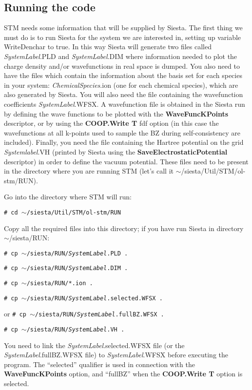 \subsection{Running the code}

 {\sc STM} needs some information that will be supplied by {\sc Siesta}. 
 The first thing we must do is to run {\sc Siesta} for 
 the system we are interested in,
 setting up variable WriteDenchar to true. 
 In this way {\sc Siesta} will generate
 two files called {\it SystemLabel}.PLD and {\it SystemLabel}.DIM
 where information 
 needed to plot the charge density and/or wavefunctions 
 in real space is dumped. You also need to have the files which
 contain the information about the basis set for each species
 in your system: {\it ChemicalSpecies}.ion (one for each
 chemical species), which
 are also generated by  {\sc Siesta}.
 You will also need the file containing the
 wavefunction coefficients {\it SystemLabel}.WFSX. 
 A wavefunction file is obtained
 in the {\sc Siesta} run by defining the wave functions to be
 plotted with the {\bf WaveFuncKPoints} descriptor, or by using the
 {\bf COOP.Write T} fdf option (in this case the
 wavefunctions at all k-points used to sample the BZ during
 self-consistency are included).
 Finally, you need the file containing the Hartree potential on the grid 
 {\it Systemlabel}.VH (printed by {\sc Siesta} using the 
 {\bf SaveElectrostaticPotential} descriptor)
 in order to define the vacuum potential. 
 These files need to be present in the
 directory where you are running {\sc STM} (let's call it
 $\sim$/siesta/Util/STM/ol-stm/RUN).

 Go into the directory where {\sc STM} will run:

 {\tt \# cd $\sim$/siesta/Util/STM/ol-stm/RUN}

 Copy all the required files into this directory; if you
 have run {\sc Siesta} in directory $\sim$/siesta/RUN:

 {\tt \# cp $\sim$/siesta/RUN/{\it SystemLabel}.PLD .}

 {\tt \# cp $\sim$/siesta/RUN/{\it SystemLabel}.DIM .}

 {\tt \# cp $\sim$/siesta/RUN/*.ion .}

 {\tt \# cp $\sim$/siesta/RUN/{\it SystemLabel}.selected.WFSX .}

 or  {\tt \# cp $\sim$/siesta/RUN/{\it SystemLabel}.fullBZ.WFSX .}

 {\tt \# cp $\sim$/siesta/RUN/{\it SystemLabel}.VH .}

 You need to link the {\it SystemLabel}.selected.WFSX file (or the
 {\it SystemLabel}.fullBZ.WFSX file) to {\it SystemLabel}.WFSX before
 executing the program. The ``selected'' qualifier is used in
 connection with the {\bf WaveFuncKPoints} option, and ``fullBZ'' when
 the {\bf COOP.Write T} option is selected.
      
